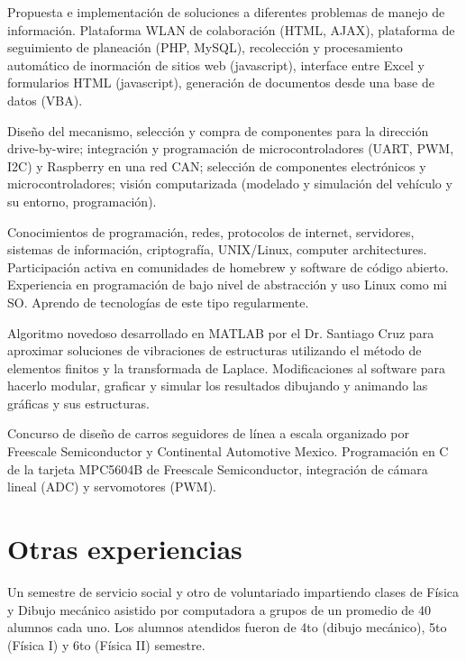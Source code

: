\documentclass[11pt,a4paper,sans]{moderncv}	%
\begin{document}
{Propuesta e implementación de soluciones a diferentes problemas de manejo de información. Plataforma WLAN de colaboración (HTML, AJAX), plataforma de seguimiento de planeación (PHP, MySQL), recolección y procesamiento automático de inormación de sitios web (javascript), interface entre Excel y formularios HTML (javascript), generación de documentos desde una base de datos (VBA).}

{Diseño del mecanismo, selección y compra de componentes para la dirección drive-by-wire; integración y programación de microcontroladores (UART, PWM, I2C) y Raspberry en una red CAN; selección de componentes electrónicos y microcontroladores; visión computarizada (modelado y simulación del vehículo y su entorno, programación).}

{Conocimientos de programación, redes, protocolos de internet, servidores, sistemas de información, criptografía, UNIX/Linux, computer architectures. Participación activa en comunidades de homebrew y software de código abierto. Experiencia en programación de bajo nivel de abstracción y uso Linux como mi SO. Aprendo de tecnologías de este tipo regularmente.}

{Algoritmo novedoso desarrollado en MATLAB por el Dr. Santiago Cruz para aproximar soluciones de vibraciones de estructuras utilizando el método de elementos finitos y la transformada de Laplace. Modificaciones al software para hacerlo modular, graficar y simular los resultados dibujando y animando las gráficas y sus estructuras.}

{Concurso de diseño de carros seguidores de línea a escala organizado por Freescale Semiconductor y Continental Automotive Mexico. Programación en C de la tarjeta MPC5604B de Freescale Semiconductor, integración de cámara lineal (ADC) y servomotores (PWM).}

\section{Otras experiencias}
{Un semestre de servicio social y otro de voluntariado impartiendo clases de Física y Dibujo mecánico asistido por computadora a grupos de un promedio de 40 alumnos cada uno. Los alumnos atendidos fueron de 4to (dibujo mecánico), 5to (Física I) y 6to (Física II) semestre.}
\end{document}
